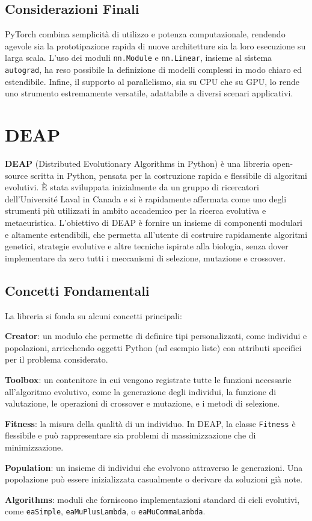 \subsection{Considerazioni Finali}
PyTorch combina semplicità di utilizzo e potenza computazionale, rendendo agevole sia la prototipazione rapida di nuove architetture sia la loro esecuzione su larga scala. L'uso dei moduli \texttt{nn.Module} e \texttt{nn.Linear}, insieme al sistema \texttt{autograd}, ha reso possibile la definizione di modelli complessi in modo chiaro ed estendibile. Infine, il supporto al parallelismo, sia su CPU che su GPU, lo rende uno strumento estremamente versatile, adattabile a diversi scenari applicativi.


\section{DEAP}
\textbf{DEAP} (Distributed Evolutionary Algorithms in Python) è una libreria open-source scritta in Python, pensata per la costruzione rapida e flessibile di algoritmi evolutivi. È stata sviluppata inizialmente da un gruppo di ricercatori dell'Université Laval in Canada e si è rapidamente affermata come uno degli strumenti più utilizzati in ambito accademico per la ricerca evolutiva e metaeuristica.  
L'obiettivo di DEAP è fornire un insieme di componenti modulari e altamente estendibili, che permetta all'utente di costruire rapidamente algoritmi genetici, strategie evolutive e altre tecniche ispirate alla biologia, senza dover implementare da zero tutti i meccanismi di selezione, mutazione e crossover.

\subsection{Concetti Fondamentali}
La libreria si fonda su alcuni concetti principali:
\begin{compactitemize}
    \item \textbf{Creator}: un modulo che permette di definire tipi personalizzati, come individui e popolazioni, arricchendo oggetti Python (ad esempio liste) con attributi specifici per il problema considerato.
    \item \textbf{Toolbox}: un contenitore in cui vengono registrate tutte le funzioni necessarie all'algoritmo evolutivo, come la generazione degli individui, la funzione di valutazione, le operazioni di crossover e mutazione, e i metodi di selezione.
    \item \textbf{Fitness}: la misura della qualità di un individuo. In DEAP, la classe \texttt{Fitness} è flessibile e può rappresentare sia problemi di massimizzazione che di minimizzazione.
    \item \textbf{Population}: un insieme di individui che evolvono attraverso le generazioni. Una popolazione può essere inizializzata casualmente o derivare da soluzioni già note.
    \item \textbf{Algorithms}: moduli che forniscono implementazioni standard di cicli evolutivi, come \texttt{eaSimple}, \texttt{eaMuPlusLambda}, o \texttt{eaMuCommaLambda}.
\end{compactitemize}

